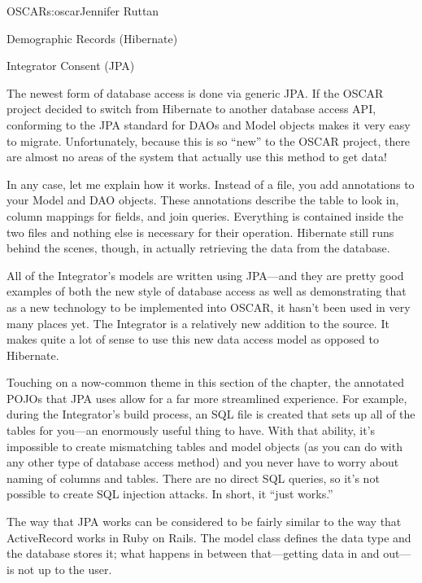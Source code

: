 \begin{aosachapter}{OSCAR}{s:oscar}{Jennifer Ruttan}
\begin{aosasect1}{Demographic Records (Hibernate)}
\end{aosasect1}

\begin{aosasect1}{Integrator Consent (JPA)}

The newest form of database access is done via generic JPA. If the
OSCAR project decided to switch from Hibernate to another database
access API, conforming to the JPA standard for DAOs and Model objects
makes it very easy to migrate. Unfortunately, because this is so
``new'' to the OSCAR project, there are almost no areas of the system
that actually use this method to get data!

In any case, let me explain how it works. Instead of a 
file, you add annotations to your Model and DAO objects. These
annotations describe the table to look in, column mappings for fields,
and join queries. Everything is contained inside the two files and
nothing else is necessary for their operation. Hibernate still runs
behind the scenes, though, in actually retrieving the data from the
database.

All of the Integrator's models are written using JPA---and they are
pretty good examples of both the new style of database access as well
as demonstrating that as a new technology to be implemented into
OSCAR, it hasn't been used in very many places yet. The Integrator is
a relatively new addition to the source. It makes quite a lot of sense
to use this new data access model as opposed to Hibernate.

Touching on a now-common theme in this section of the chapter, the
annotated POJOs that JPA uses allow for a far more streamlined
experience. For example, during the Integrator's build process, an SQL
file is created that sets up all of the tables for you---an enormously
useful thing to have. With that ability, it's impossible to create
mismatching tables and model objects (as you can do with any other
type of database access method) and you never have to worry about
naming of columns and tables. There are no direct SQL queries, so it's
not possible to create SQL injection attacks. In short, it ``just
works.''

The way that JPA works can be considered to be fairly similar to the
way that ActiveRecord works in Ruby on Rails. The model class defines
the data type and the database stores it; what happens in between
that---getting data in and out---is not up to the user.

\end{aosasect1}


\end{aosachapter}
